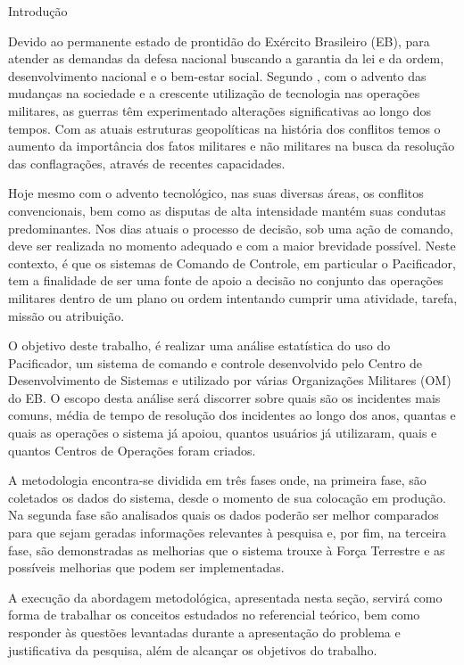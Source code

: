 \caption{Introdução}
\hspace{1.5cm}
Devido ao permanente estado de prontidão do Exército Brasileiro (EB), para atender as demandas da defesa nacional buscando a garantia da lei e da ordem, desenvolvimento nacional e o bem-estar social. Segundo \cite{operacao2017}, com o advento das mudanças na sociedade e a crescente utilização de  tecnologia nas operações militares, as guerras têm experimentado alterações significativas ao longo dos tempos. Com as atuais estruturas geopolíticas na história dos conflitos temos o aumento da importância dos fatos militares e não militares na busca da resolução das conflagrações, através de recentes capacidades.

\hspace{1.5cm}
Hoje mesmo com o advento tecnológico, nas suas diversas áreas, os conflitos convencionais, bem como as disputas de alta intensidade mantém suas condutas predominantes. Nos dias atuais o processo de decisão, sob uma ação de comando, deve ser realizada no momento adequado e com a maior brevidade possível. Neste contexto, é que os sistemas de Comando de Controle, em particular o Pacificador, tem a finalidade de ser uma fonte de apoio a decisão no conjunto das operações militares dentro de um plano ou ordem intentando cumprir uma atividade, tarefa, missão ou atribuição. 

\hspace{1.5cm}
O objetivo deste trabalho, é realizar uma análise estatística do uso do Pacificador, um sistema de comando e controle desenvolvido pelo Centro de Desenvolvimento de Sistemas e utilizado por várias Organizações Militares (OM) do EB. O escopo desta análise será discorrer sobre quais são os incidentes mais comuns, média de tempo de resolução dos incidentes ao longo dos anos, quantas e quais as operações o sistema já apoiou, quantos usuários já utilizaram, quais e quantos Centros de Operações foram criados.

\hspace{1.5cm}
A metodologia encontra-se dividida em três fases onde, na primeira fase, são coletados os dados do sistema, desde o momento de sua colocação em produção. Na segunda fase são analisados quais os dados poderão ser melhor comparados para que sejam geradas informações relevantes à pesquisa e, por fim, na terceira fase, são demonstradas as melhorias que o sistema trouxe à Força Terrestre e as possíveis melhorias que podem ser implementadas.

\hspace*{1.5cm}
A execução da abordagem metodológica, apresentada nesta seção, servirá como forma de trabalhar os conceitos estudados no referencial teórico, bem como responder às questões levantadas durante a apresentação do problema e justificativa da pesquisa, além de alcançar os objetivos do trabalho.



